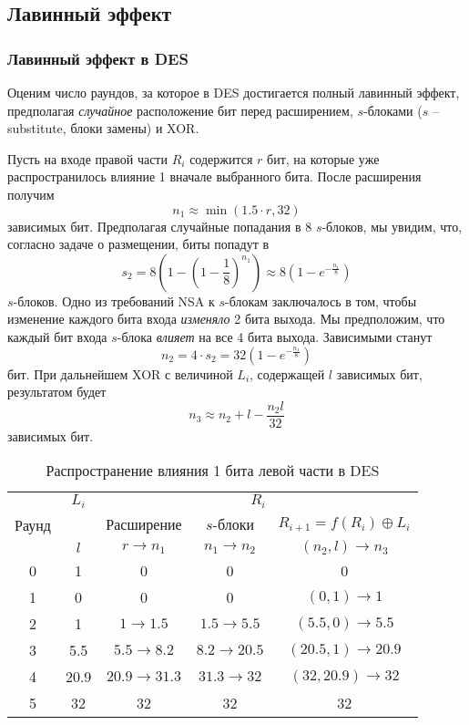 \subsection{Лавинный эффект}

\subsubsection{Лавинный эффект в DES}

Оценим число раундов, за которое в DES достигается полный лавинный эффект, предполагая \emph{случайное} расположение бит перед расширением, $s$-блоками ($s$ -- substitute, блоки замены) и XOR.

Пусть на входе правой части $R_i$ содержится $r$ бит, на которые уже распространилось влияние 1 вначале выбранного бита. После расширения получим
    \[ n_1 \approx \min(1.5 \cdot r, 32) \]
зависимых бит. Предполагая случайные попадания в 8 $s$-блоков, мы увидим, что, согласно задаче о размещении, биты попадут в
    \[ s_2 = 8 \left( 1 - \left( 1 - \frac{1}{8} \right)^{n_1} \right) \approx 8 \left( 1 - e^{-\frac{n_1}{8}} \right) \]
$s$-блоков. Одно из требований NSA к $s$-блокам заключалось в том, чтобы изменение каждого бита входа \emph{изменяло} 2 бита выхода. Мы предположим, что каждый бит входа $s$-блока \emph{влияет} на все 4 бита выхода. Зависимыми станут
    \[ n_2 = 4 \cdot s_2 = 32 \left( 1 - e^{-\frac{n_1}{8}} \right) \]
бит. При дальнейшем XOR с величиной $L_i$, содержащей $l$ зависимых бит, результатом будет
    \[ n_3 \approx n_2 + l  - \frac{n_2 l}{32} \]
зависимых бит.

\begin{table}[!ht]
    \centering
    \caption{Распространение влияния 1 бита левой части в DES\label{tab-DES-avalance-effect}}
    \begin{tabular}{||c||c||c|c|c||}
        \hline
        \multirow{3}{*}{Раунд} & $L_i$ & \multicolumn{3}{|c||}{$R_i$} \\
        \cline{2-5}
        & & Расширение & $s$-блоки & $R_{i+1} = f(R_i) \oplus L_i$ \\
        & $l$ & $r \rightarrow n_1$ & $n_1 \rightarrow n_2$ & $(n_2, l) \rightarrow n_3$ \\
        \hline \hline
        0 & 1 & 0 & 0 & 0 \\
        1 & 0 & 0 & 0 & $(0,1) \rightarrow 1$ \\
        2 & 1 & $1 \rightarrow 1.5$ & $1.5 \rightarrow 5.5$ & $(5.5, 0) \rightarrow 5.5$ \\
        3 & 5.5 & $5.5 \rightarrow 8.2$ & $8.2 \rightarrow 20.5$ & $(20.5, 1) \rightarrow 20.9$ \\
        4 & 20.9 & $20.9 \rightarrow 31.3$ & $31.3 \rightarrow 32$ & $(32, 20.9) \rightarrow 32$ \\
        5 & 32 & 32 & 32 & 32 \\
      \hline
    \end{tabular}
\end{table}

